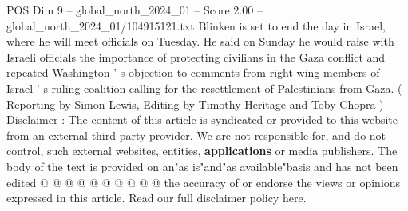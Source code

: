 \begin{textsample}{POS Dim 9 – global\_north\_2024\_01 – Score 2.00 – global\_north\_2024\_01/104915121.txt}
Blinken is set to end the day in Israel, where he will meet officials on Tuesday.
He said on Sunday he would raise with Israeli officials the importance of protecting civilians in the Gaza conflict and repeated Washington ' s objection to comments from right-wing members of Israel ' s ruling coalition calling for the resettlement of Palestinians from Gaza. ( Reporting by Simon Lewis, Editing by Timothy Heritage and Toby Chopra ) Disclaimer : The content of this article is syndicated or provided to this website from an external third party provider.
We are not responsible for, and do not control, such external websites, entities, \textbf{applications} or media publishers.
The body of the text is provided on an"as is"and"as available"basis and has not been edited @ @ @ @ @ @ @ @ @ @ the accuracy of or endorse the views or opinions expressed in this article.
Read our full disclaimer policy here.

\end{textsample}
